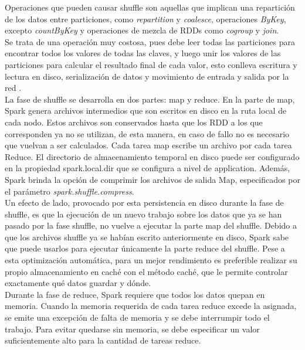 Operaciones que pueden causar shuffle son aquellas que implican una repartición de los datos entre particiones, como \textit{repartition} y \textit{coalesce}, operaciones \textit{ByKey}, excepto  \textit{countByKey} y operaciones de mezcla de RDDs como \textit{cogroup} y \textit{join}.\\

Se trata de una operación muy costosa, pues debe leer todas las particiones para encontrar todos los valores de todas las claves, y luego unir los valores de las particiones para calcular el resultado final de cada valor, esto conlleva escritura y lectura en disco, serialización de datos y movimiento de entrada y salida por la red \cite{6RDD_Documentation}.\\

La fase de shuffle se desarrolla en dos partes: map y reduce. En la parte de map, Spark genera archivos intermedios que son escritos en disco en la ruta local de cada nodo. Estos archivos son conservados hasta que los RDD a los que corresponden ya no se utilizan, de esta manera, en caso de fallo no es necesario que vuelvan a ser calculados. Cada tarea map escribe un archivo por cada tarea Reduce. El directorio de almacenamiento temporal en disco puede ser configurado en la propiedad spark.local.dir que se configura a nivel de application. Además, Spark brinda la opción de comprimir los archivos de salida Map, especificados por el parámetro \textit{spark.shuffle.compress}.\\

Un efecto de lado, provocado por esta persistencia en disco durante la fase de shuffle, es que la ejecución de un nuevo trabajo sobre los datos que ya se han pasado por la fase shuffle, no vuelve a ejecutar la parte map del shuffle. Debido a que los archivos shuffle ya se habían escrito anteriormente en disco, Spark sabe que puede usarlos para ejecutar únicamente la parte reduce del shuffle. Pese a esta optimización automática,  para un mejor rendimiento es preferible realizar su propio almacenamiento en caché con el método caché, que le permite controlar exactamente qué datos guardar y dónde.\\

Durante la fase de reduce, Spark requiere que todos los datos quepan en memoria. Cuando la memoria requerida de cada tarea reduce excede la asignada, se emite una excepción de falta de memoria y se debe interrumpir todo el trabajo. Para evitar quedarse sin memoria, se debe especificar un valor suficientemente alto para la cantidad de tareas reduce.\\

